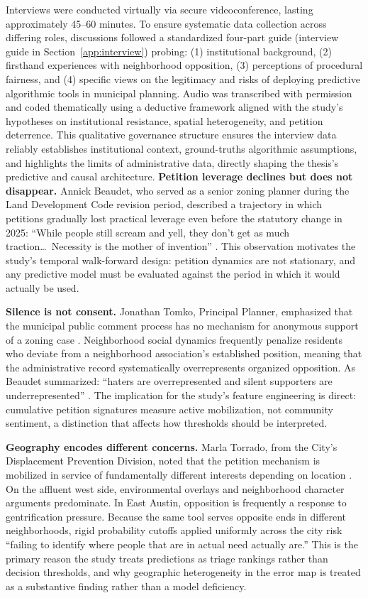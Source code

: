Interviews were conducted virtually via secure videoconference, lasting approximately 45--60 minutes. To ensure systematic data collection across differing roles, discussions followed a standardized four-part guide (interview guide in Section~\ref{app:interview}) probing: (1) institutional background, (2) firsthand experiences with neighborhood opposition, (3) perceptions of procedural fairness, and (4) specific views on the legitimacy and risks of deploying predictive algorithmic tools in municipal planning. Audio was transcribed with permission and coded thematically using a deductive framework aligned with the study's hypotheses on institutional resistance, spatial heterogeneity, and petition deterrence. This qualitative governance structure ensures the interview data reliably establishes institutional context, ground-truths algorithmic assumptions, and highlights the limits of administrative data, directly shaping the thesis's predictive and causal architecture.
\textbf{Petition leverage declines but does not disappear.} Annick Beaudet, who served as a senior zoning planner during the Land Development Code revision period, described a trajectory in which petitions gradually lost practical leverage even before the statutory change in 2025: ``While people still scream and yell, they don't get as much traction\ldots\ Necessity is the mother of invention'' \cite{interview_beaudet2025,cityaustin2017codenext}. This observation motivates the study's temporal walk-forward design: petition dynamics are not stationary, and any predictive model must be evaluated against the period in which it would actually be used.

\textbf{Silence is not consent.} Jonathan Tomko, Principal Planner, emphasized that the municipal public comment process has no mechanism for anonymous support of a zoning case \cite{interview_tomko2026}. Neighborhood social dynamics frequently penalize residents who deviate from a neighborhood association's established position, meaning that the administrative record systematically overrepresents organized opposition. As Beaudet summarized: ``haters are overrepresented and silent supporters are underrepresented'' \cite{interview_beaudet2025}. The implication for the study's feature engineering is direct: cumulative petition signatures measure active mobilization, not community sentiment, a distinction that affects how thresholds should be interpreted.

\textbf{Geography encodes different concerns.} Marla Torrado, from the City's Displacement Prevention Division, noted that the petition mechanism is mobilized in service of fundamentally different interests depending on location \cite{interview_marla2025}. On the affluent west side, environmental overlays and neighborhood character arguments predominate. In East Austin, opposition is frequently a response to gentrification pressure. Because the same tool serves opposite ends in different neighborhoods, rigid probability cutoffs applied uniformly across the city risk ``failing to identify where people that are in actual need actually are.'' This is the primary reason the study treats predictions as triage rankings rather than decision thresholds, and why geographic heterogeneity in the error map is treated as a substantive finding rather than a model deficiency.

